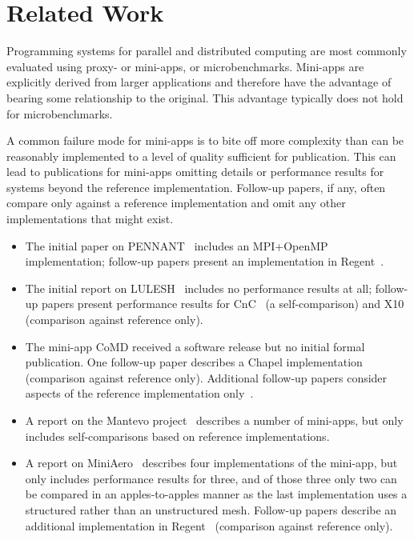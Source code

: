 \section{Related Work}
\label{sec:related-work}

Programming systems for parallel and distributed computing are most
commonly evaluated using proxy- or mini-apps, or
microbenchmarks. Mini-apps are explicitly derived from larger
applications and therefore have the advantage of bearing some
relationship to the original. This advantage typically does not hold
for microbenchmarks.

A common failure mode for mini-apps is to bite off more complexity
than can be reasonably implemented to a level of quality sufficient
for publication. This can lead to publications for mini-apps omitting
details or performance results for systems beyond the reference
implementation. Follow-up papers, if any, often compare only against a
reference implementation and omit any other implementations that might
exist.

\begin{itemize}

\item
The initial paper on PENNANT~\cite{PENNANT} includes an MPI+OpenMP
implementation; follow-up papers present an implementation in
Regent~\cite{Regent15, ControlReplication17, LegionTracing18}.

\item
The initial report on LULESH~\cite{LULESH12} includes no performance
results at all; follow-up papers present performance results for
CnC~\cite{LULESHCNC15} (a self-comparison) and X10~\cite{LULESHX1015}
(comparison against reference only).

\item
The mini-app CoMD received a software release but no initial formal
publication. One follow-up paper describes a Chapel
implementation~\cite{CoMDChapel16} (comparison against reference
only). Additional follow-up papers consider aspects of the reference
implementation only~\cite{CoMDLoadImbalance17,
  CoMDThreadedModels14}.

\item
A report on the Mantevo project~\cite{Mantevo09} describes a number of
mini-apps, but only includes self-comparisons based on reference
implementations.

\item
A report on MiniAero~\cite{SandiaReportManyTaskRuntimes15} describes
four implementations of the mini-app, but only includes performance
results for three, and of those three only two can be compared in an
apples-to-apples manner as the last implementation uses a structured
rather than an unstructured mesh. Follow-up papers describe an
additional implementation in Regent~\cite{Regent15,
  ControlReplication17, LegionTracing18} (comparison against reference
only).

\end{itemize}

